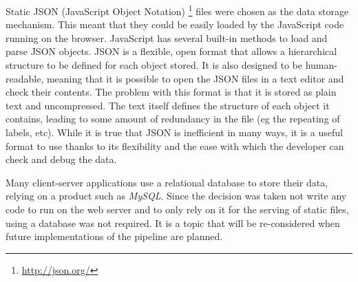 Static JSON (JavaScript Object Notation) \footnote{\url{http://json.org/}} files were chosen as the data storage mechanism. This meant that they could be easily loaded by the JavaScript code running on the browser. JavaScript has several built-in methods to load and parse JSON objects. JSON is a flexible, open format that allows a hierarchical structure to be defined for each object stored. It is also designed to be human-readable, meaning that it is possible to open the JSON files in a text editor and check their contents. The problem with this format is that it is stored as plain text and uncompressed. The text itself defines the structure of each object it contains, leading to some amount of redundancy in the file (eg the repeating of labels, etc). While it is true that JSON is inefficient in many ways, it is a useful format to use thanks to its flexibility and the ease with which the developer can check and debug the data. 

Many client-server applications use a relational database to store their data, relying on a product such as \emph{MySQL}. Since the decision was taken not write any code to run on the web server and to only rely on it for the serving of static files, using a database was not required. It is a topic that will be re-considered when future implementations of the pipeline are planned. 

